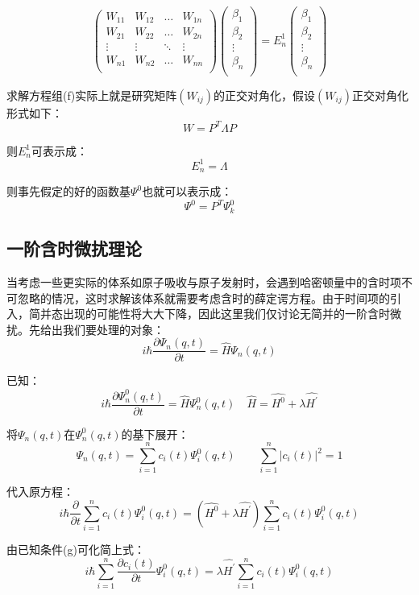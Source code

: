 \[
\begin{pmatrix}
W_{11} & W_{12} & \ldots & W_{1n}\\
W_{21} & W_{22} & \ldots & W_{2n}\\
\vdots & \vdots & \ddots & \vdots\\
W_{n1} & W_{n2} & \ldots & W_{nn}\\
\end{pmatrix}
\begin{pmatrix}
\beta_1\\
\beta_2\\
\vdots\\
\beta_n\\
\end{pmatrix}
=E_n^1
\begin{pmatrix}
\beta_1\\
\beta_2\\
\vdots\\
\beta_n\\
\end{pmatrix}
\tag{f} \]

求解方程组(f)实际上就是研究矩阵$(W_{ij})$的正交对角化，假设$(W_{ij})$正交对角化形式如下：
\[W=P^T \Lambda P\]

则$E_n^1$可表示成：
\[E_n^1=\Lambda\]

则事先假定的好的函数基$\varPsi^0$也就可以表示成：
\[\varPsi^0=P^T \varPsi^0_k\]

\subsection{一阶含时微扰理论}
当考虑一些更实际的体系如原子吸收与原子发射时，会遇到哈密顿量中的含时项不可忽略的情况，这时求解该体系就需要考虑含时的薛定谔方程。由于时间项的引入，简并态出现的可能性将大大下降，因此这里我们仅讨论无简并的一阶含时微扰。先给出我们要处理的对象：
\[i \hbar \frac{\partial \varPsi_n(q,t)}{\partial t}=\hat{H} \varPsi_n(q,t)\]

已知：
\[i \hbar \frac{\partial \varPsi_n^0(q,t)}{\partial t}=\hat{H} \varPsi_n^0(q,t)\quad \hat{H}=\hat{H^0}+\lambda\hat{H^{'}}\tag{g}\]

将$\varPsi_n(q,t)$在$\varPsi_n^0(q,t)$的基下展开：
\[\varPsi_n(q,t)=\sum_{i=1}^nc_i(t)\varPsi_i^0(q,t) \qquad \sum_{i=1}^n|c_i(t)|^2=1\]

代入原方程：
\[i \hbar \frac{\partial}{\partial t}\sum_{i=1}^nc_i(t)\varPsi_i^0(q,t)=(\hat{H^0}+\lambda\hat{H^{'}}) \sum_{i=1}^nc_i(t)\varPsi_i^0(q,t)\]

由已知条件(g)可化简上式：
\[i \hbar \sum_{i=1}^n\frac{\partial c_i(t)}{\partial t}\varPsi_i^0(q,t)=\lambda\hat{H^{'}} \sum_{i=1}^nc_i(t)\varPsi_i^0(q,t)\]

